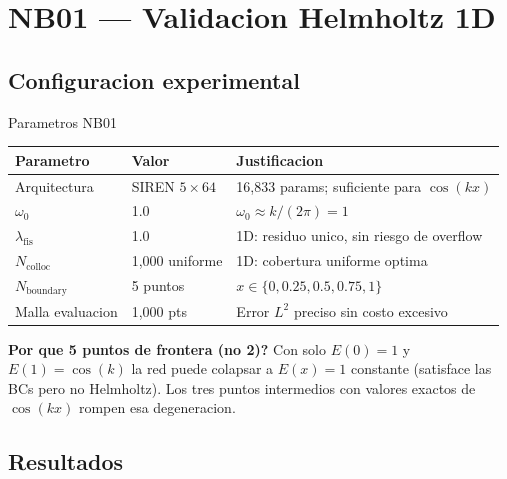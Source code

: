\documentclass[12pt,a4paper]{article}
\begin{document}
\section{NB01 --- Validacion Helmholtz 1D}

\subsection{Configuracion experimental}

\begin{definbox}{Parametros NB01}
\begin{tabular}{lll}
\toprule
Parametro & Valor & Justificacion \\
\midrule
Arquitectura & SIREN $5\times64$ & 16,833 params; suficiente para $\cos(kx)$ \\
$\omega_0$ & 1.0 & $\omega_0 \approx k/(2\pi) = 1$ \\
$\lambda_\text{fis}$ & 1.0 & 1D: residuo unico, sin riesgo de overflow \\
$N_\text{colloc}$ & 1,000 uniforme & 1D: cobertura uniforme optima \\
$N_\text{boundary}$ & 5 puntos & $x \in \{0, 0.25, 0.5, 0.75, 1\}$ \\
Malla evaluacion & 1,000 pts & Error $L^2$ preciso sin costo excesivo \\
\bottomrule
\end{tabular}
\vspace{4pt}

\textbf{Por que 5 puntos de frontera (no 2)?} Con solo $E(0)=1$ y $E(1)=\cos(k)$
la red puede colapsar a $E(x)=1$ constante (satisface las BCs pero no Helmholtz).
Los tres puntos intermedios con valores exactos de $\cos(kx)$ rompen esa degeneracion.
\end{definbox}

\subsection{Resultados}
\end{document}
